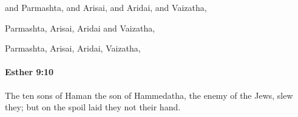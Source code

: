 			\begin{versebox}
					\item[BHS] 
					\item[LXX] 
					\item[ASV] and Parmashta, and Arisai, and Aridai, and Vaizatha,
					\item[NIV] Parmashta, Arisai, Aridai and Vaizatha,
					\item[NRSV] Parmashta, Arisai, Aridai, Vaizatha,
			\end{versebox}

		\paragraph{Esther 9:10} %
			\label{ESTHER-9-10}

			The ten sons of Haman the son of Hammedatha, the enemy of the Jews, slew they; but on the spoil laid they not their hand.

